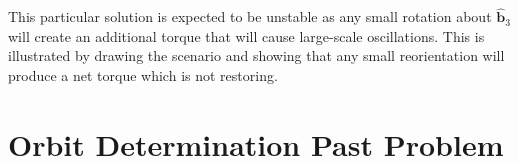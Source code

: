 \documentclass[
]{article}
\let\oldsection\section
\renewcommand\section{\clearpage\oldsection}
\begin{document}
This particular solution is expected to be unstable as any small
rotation about \(\hat{\boldsymbol{b}}_3\) will create an additional
torque that will cause large-scale oscillations. This is illustrated by
drawing the scenario and showing that any small reorientation will
produce a net torque which is not restoring.

\section{Orbit Determination Past
Problem}\label{orbit-determination-past-problem}
\end{document}
